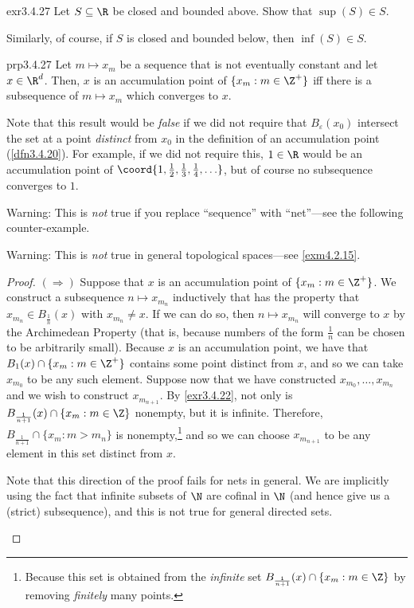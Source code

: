 \begin{exr}{}{exr3.4.27}
Let $S\subseteq \R$ be closed and bounded above.  Show that $\sup (S)\in S$.
\begin{rmk}
Similarly, of course, if $S$ is closed and bounded below, then $\inf (S)\in S$.
\end{rmk}
\end{exr}
\begin{prp}{}{prp3.4.27}
Let $m\mapsto x_m$ be a sequence that is not eventually constant and let $x\in \R ^d$.  Then, $x$ is an accumulation point of $\{ x_m :m\in \Z ^+\}$ iff there is a subsequence of $m\mapsto x_m$ which converges to $x$.
\begin{rmk}
Note that this result would be \emph{false} if we did not require that $B_\varepsilon (x_0)$ intersect the set at a point \emph{distinct} from $x_0$ in the definition of an accumulation point (\cref{dfn3.4.20}).  For example, if we did not require this, $1\in \R$ would be an accumulation point of $\coord{1,\frac{1}{2},\frac{1}{3},\frac{1}{4},\ldots}$, but of course no subsequence converges to $1$.
\end{rmk}
\begin{wrn}
Warning:  This is \emph{not} true if you replace ``sequence'' with ``net''---see the following counter-example.
\end{wrn}
\begin{wrn}
Warning:  This is \emph{not} true in general topological spaces---see \cref{exm4.2.15}.
\end{wrn}
\begin{proof}
$(\Rightarrow )$ Suppose that $x$ is an accumulation point of $\{ x_m :m\in \Z ^+\}$.  We construct a subsequence $n\mapsto x_{m_n}$ inductively that has the property that $x_{m_n}\in B_{\frac{1}{n}}(x)$ with $x_{m_n}\neq x$.  If we can do so, then $n\mapsto x_{m_n}$ will converge to $x$ by the Archimedean Property (that is, because numbers of the form $\frac{1}{n}$ can be chosen to be arbitrarily small).  Because $x$ is an accumulation point, we have that $B_1(x)\cap \{ x_m:m\in \Z ^+\}$ contains some point distinct from $x$, and so we can take $x_{m_0}$ to be any such element.  Suppose now that we have constructed $x_{m_0},\ldots ,x_{m_n}$ and we wish to construct $x_{m_{n+1}}$.  By \cref{exr3.4.22}, not only is $B_{\frac{1}{n+1}}(x)\cap \{ x_m:m\in \Z \}$ nonempty, but it is infinite.  Therefore, $B_{\frac{1}{n+1}}\cap \{ x_m:m>m_n\}$ is nonempty,\footnote{Because this set is obtained from the \emph{infinite} set $B_{\frac{1}{n+1}}(x)\cap \{ x_m:m\in \Z \}$ by removing \emph{finitely} many points.} and so we can choose $x_{m_{n+1}}$ to be any element in this set distinct from $x$.
\begin{rmk}
Note that this direction of the proof fails for nets in general.  We are implicitly using the fact that infinite subsets of $\N$ are cofinal in $\N$ (and hence give us a (strict) subsequence), and this is not true for general directed sets.
\end{rmk}


\end{proof}
\end{prp}
